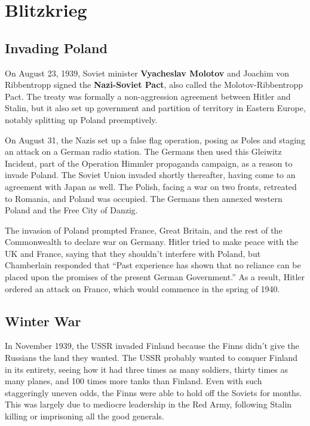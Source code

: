 \section{Blitzkrieg}

\subsection*{Invading Poland}

On August 23, 1939, Soviet minister \textbf{Vyacheslav Molotov} and Joachim von Ribbentropp signed the
\textbf{Nazi-Soviet Pact}, also called the Molotov-Ribbentropp Pact.
The treaty was formally a non-aggression agreement between Hitler and Stalin,
but it also set up government and partition of territory in Eastern Europe,
notably splitting up Poland preemptively.

On August 31, the Nazis set up a false flag operation,
posing as Poles and staging an attack on a German radio station.
The Germans then used this Gleiwitz Incident, part of the Operation Himmler propaganda campaign,
as a reason to invade Poland.
The Soviet Union invaded shortly thereafter, having come to an agreement with Japan as well.
The Polish, facing a war on two fronts, retreated to Romania, and Poland was occupied.
The Germans then annexed western Poland and the Free City of Danzig.

The invasion of Poland prompted France, Great Britain, and the rest of the Commonwealth to declare war on Germany.
Hitler tried to make peace with the UK and France, saying that they shouldn't interfere with Poland,
but Chamberlain responded that
``Past experience has shown that no reliance can be placed upon the promises of the present German Government.''
As a result, Hitler ordered an attack on France, which would commence in the spring of 1940.

\subsection*{Winter War}

In November 1939, the USSR invaded Finland because the Finns didn't give the Russians the land they wanted.
The USSR probably wanted to conquer Finland in its entirety,
seeing how it had three times as many soldiers, thirty times as many planes, and 100 times more tanks than Finland.
Even with such staggeringly uneven odds, the Finns were able to hold off the Soviets for months.
This was largely due to mediocre leadership in the Red Army,
following Stalin killing or imprisoning all the good generals.

